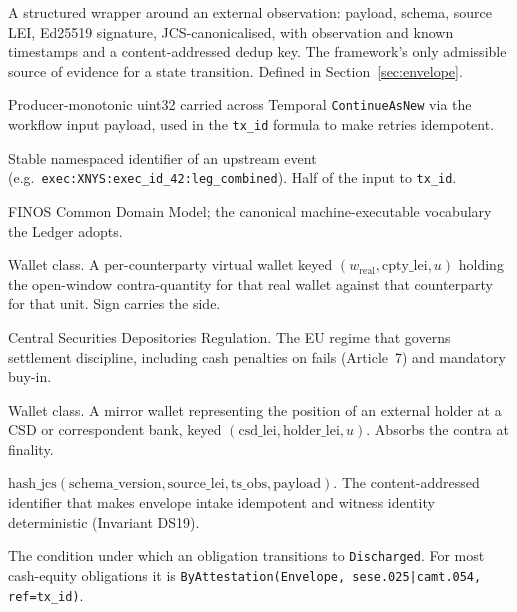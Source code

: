 \documentclass[11pt,a4paper]{article}
\begin{document}
\begin{description}[style=nextline,leftmargin=1.5em]

\item[Attestation envelope] A structured wrapper around an external observation: payload, schema, source LEI, Ed25519 signature, JCS-canonicalised, with observation and known timestamps and a content-addressed dedup key. The framework's only admissible source of evidence for a state transition. Defined in Section~\ref{sec:envelope}.

\item[\texttt{attempt\_seq}] Producer-monotonic uint32 carried across Temporal \texttt{ContinueAsNew} via the workflow input payload, used in the \texttt{tx\_id} formula to make retries idempotent.

\item[\texttt{business\_event\_id}] Stable namespaced identifier of an upstream event (e.g.\ \texttt{exec:XNYS:exec\_id\_42:leg\_combined}). Half of the input to \texttt{tx\_id}.

\item[CDM] FINOS Common Domain Model; the canonical machine-executable vocabulary the Ledger adopts.

\item[\texttt{cpty\_virtual}] Wallet class. A per-counterparty virtual wallet keyed $(w_{\mathrm{real}}, \mathrm{cpty\_lei}, u)$ holding the open-window contra-quantity for that real wallet against that counterparty for that unit. Sign carries the side.

\item[CSDR] Central Securities Depositories Regulation. The EU regime that governs settlement discipline, including cash penalties on fails (Article~7) and mandatory buy-in.

\item[\texttt{csd\_virtual}] Wallet class. A mirror wallet representing the position of an external holder at a CSD or correspondent bank, keyed $(\mathrm{csd\_lei}, \mathrm{holder\_lei}, u)$. Absorbs the contra at finality.

\item[\texttt{dedup\_key}] $\mathrm{hash\_jcs}(\mathrm{schema\_version}, \mathrm{source\_lei}, \mathrm{ts\_obs}, \mathrm{payload})$. The content-addressed identifier that makes envelope intake idempotent and witness identity deterministic (Invariant DS19).

\item[Discharge predicate] The condition under which an obligation transitions to \texttt{Discharged}. For most cash-equity obligations it is \texttt{ByAttestation(Envelope, sese.025|camt.054, ref=tx\_id)}.


\end{description}
\end{document}
